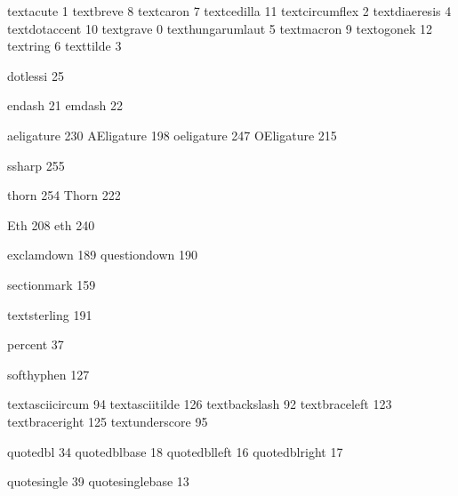 \stopmapping

\startencoding[ec][ec] %

 textacute         1
 textbreve         8
 textcaron         7
 textcedilla      11
 textcircumflex    2
 textdiaeresis     4
 textdotaccent    10
 textgrave         0
 texthungarumlaut  5
 textmacron        9
 textogonek       12
 textring          6
 texttilde         3

 dotlessi         25

 endash           21
 emdash           22

 aeligature      230
 AEligature      198
 oeligature      247
 OEligature      215

 ssharp          255

 thorn           254
 Thorn           222

 Eth             208
 eth             240

 exclamdown      189 %
 questiondown    190 %

 sectionmark     159

 textsterling    191

 percent          37

 softhyphen      127 %

 textasciicircum  94
 textasciitilde  126
 textbackslash    92
 textbraceleft   123
 textbraceright  125
 textunderscore   95

 quotedbl         34
 quotedblbase     18
 quotedblleft     16
 quotedblright    17

 quotesingle      39 %
 quotesinglebase  13

